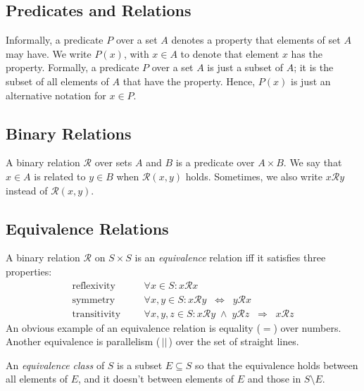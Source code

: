\subsection*{Predicates and Relations}

Informally, a predicate $P$ over a set $A$ denotes a property that
elements of set $A$ may have. We write $P(x)$, with $x \in A$ to denote that
element $x$ has the property. Formally, a predicate $P$ over a set
$A$ is just a subset of $A$; it is the subset of all elements of $A$ that have
the property. Hence, $P(x)$ is just an alternative notation for $x \in P$.

\subsection*{Binary Relations}

A binary relation $\mathcal{R}$ over sets $A$ and $B$ is a predicate over $A
\times B$. We say that $x \in A$ is related to $y \in B$ when
$\mathcal{R}(x,y)$ holds. Sometimes, we also write $x\mathcal{R}y$ instead of
$\mathcal{R}(x,y)$.

\subsection*{Equivalence Relations}

A binary relation $\mathcal{R}$ on $S \times S$ is an \emph{equivalence} relation iff it satisfies three properties:
\begin{equation*}\begin{aligned}
	\text{reflexivity}  && &\forall x \in S: x\mathcal{R}x \\
	\text{symmetry}     && &\forall x, y \in S: x\mathcal{R}y \;\;\Leftrightarrow\;\; y\mathcal{R}x \\
	\text{transitivity} && &\forall x, y, z \in S: x\mathcal{R}y \;\wedge\; y\mathcal{R}z \;\;\Rightarrow\;\; x\mathcal{R}z
\end{aligned}\end{equation*}
An obvious example of an equivalence relation is equality ($=$) over numbers. Another equivalence is parallelism ($\,||\,$) over the set of straight lines.

An \emph{equivalence class} of $S$ is a subset $E\subseteq S$ so that the equivalence holds between all elements of $E$, and it doesn't between elements of $E$ and those in $S\setminus E$.

